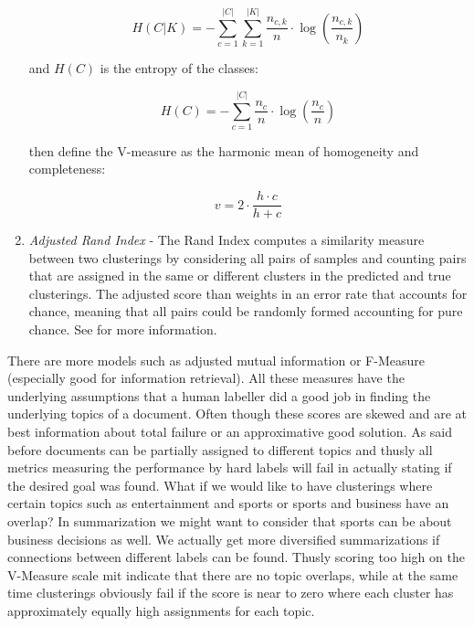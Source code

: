 \begin{enumerate}
          \begin{equation}
            H(C|K) = - \sum_{c=1}^{|C|} \sum_{k=1}^{|K|} \frac{n_{c,k}}{n}\cdot \log\left(\frac{n_{c,k}}{n_k}\right)
          \end{equation}

        and $H(C)$ is the entropy of the classes:

          \begin{equation}
            H(C) = - \sum_{c=1}^{|C|} \frac{n_c}{n} \cdot \log\left(\frac{n_c}{n}\right)
          \end{equation}

        \cite{VMeasure2007} then define the V-measure as the harmonic mean of homogeneity and completeness:

          \begin{equation}
            v = 2 \cdot \frac{h \cdot c}{h + c}
          \end{equation}

        \item \emph{Adjusted Rand Index} - The Rand Index computes a similarity measure between two clusterings by considering all pairs of samples and counting pairs that are assigned in the same or different clusters in the predicted and true clusterings. The adjusted score than weights in an error rate that accounts for chance, meaning that all pairs could be randomly formed accounting for pure chance. See \cite{RandIndex1971} for more information.
      \end{enumerate}

    There are more models such as adjusted mutual information or F-Measure (especially good for information retrieval). All these measures have the underlying assumptions that a human labeller did a good job in finding the underlying topics of a document. Often though these scores are skewed and are at best information about total failure or an approximative good solution. As said before documents can be partially assigned to different topics and thusly all metrics measuring the performance by hard labels will fail in actually stating if the desired goal was found. What if we would like to have clusterings where certain topics such as entertainment and sports or sports and business have an overlap? In summarization we might want to consider that sports can be about business decisions as well. We actually get more diversified summarizations if connections between different labels can be found. Thusly scoring too high on the V-Measure scale mit indicate that there are no topic overlaps, while at the same time clusterings obviously fail if the score is near to zero where each cluster has approximately equally high assignments for each topic.

